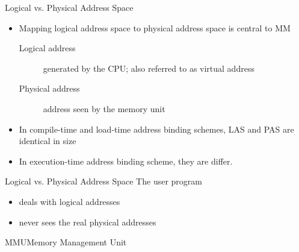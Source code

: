 \begin{frame}{Logical vs. Physical Address Space}
  \begin{itemize}
  \item Mapping logical address space to physical address space is central to MM
    \begin{description}
    \item[Logical address] generated by the CPU; also referred to as \alert{virtual
        address}
    \item[Physical address] address seen by the memory unit
    \end{description}
  \item In compile-time and load-time address binding schemes, LAS and PAS are identical
    in size
  \item In execution-time address binding scheme, they are differ.
  \end{itemize}
\end{frame}

\begin{frame}{Logical vs. Physical Address Space}%
  The user program
  \begin{itemize}
  \item deals with logical addresses
  \item never sees the real physical addresses
  \end{itemize}
  \begin{center}
  \end{center}
\end{frame}

\begin{frame}{MMU}{Memory Management Unit}
  \begin{center}
  \end{center}
\end{frame}

